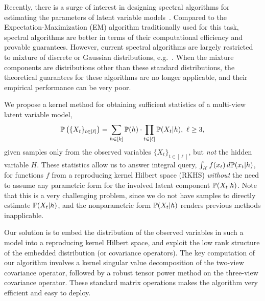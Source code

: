 \documentclass{article}
\begin{document}
\setlength{\abovedisplayskip}{4pt}
\setlength{\abovedisplayshortskip}{1pt}
\setlength{\belowdisplayskip}{4pt}
\setlength{\belowdisplayshortskip}{1pt}
\setlength{\jot}{3pt}

\setlength{\textfloatsep}{3ex}

Recently, there is a surge of interest in designing spectral algorithms for estimating the parameters of latent variable models~\citep{HsuKakZha09,ParSonXin11,SonParXin11,FosRodUng12,AnandkumarEtal:tensor12, AnandkumarEtal:twosvd12, Franz13}. Compared to the Expectation-Maximization (EM) algorithm \citep{DemLaiRub77} traditionally used for this task, spectral algorithms are better in terms of their computational efficiency and provable guarantees. 
However, current spectral algorithms are largely restricted to mixture
of discrete or Gaussian distributions, e.g.~\citep{AnandkumarEtal:tensor12,HsuKak13}. When the mixture components are distributions other than these standard distributions, the theoretical guarantees for these algorithms are no longer applicable, and their empirical performance can be very poor.

We propose a kernel method for obtaining sufficient statistics of a multi-view latent variable model, 
\begin{align}
  \mathbb{P}\left(\{X_t\}_{t \in [\ell]}\right)=\sum_{h \in [k]} \mathbb{P}(h) \cdot \prod_{t \in [\ell]} \mathbb{P}(X_t|h),~\ell\geq 3, 
  \label{eq:multiview_model}
\end{align}
given samples only from the observed variables $\{X_t\}_{t \in [\ell]}$, but \emph{not} the hidden variable $H$. These statistics allow us to answer integral query, $\int_{\mathcal{X}} f(x_t)\, d \mathbb{P}(x_t|h)$, for functions $f$ from a reproducing kernel Hilbert space (RKHS) \emph{without} the need to assume any parametric form for the involved latent component $\mathbb{P}(X_t|h)$. 
Note that this is a very challenging problem, since we do not have samples to directly estimate $\mathbb{P}(X_t|h)$, and the nonparametric form $\mathbb{P}(X_t|h)$ renders previous methods inapplicable. 

Our solution is to embed the distribution of the observed variables in such a model into a reproducing kernel Hilbert space, and exploit the low rank structure of the embedded distribution (or covariance operators). The key computation of our algorithm involves a kernel singular value decomposition of the two-view covariance operator, followed by a robust tensor power method on the three-view covariance operator. These standard matrix operations makes the algorithm very efficient and easy to deploy. 
\end{document}
